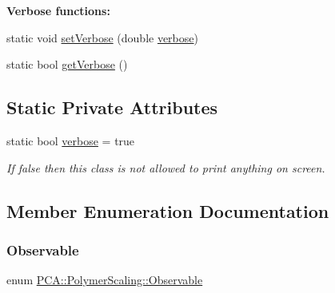 \begin{Indent}{\bf Verbose functions\+:}\par
\begin{DoxyCompactItemize}
\item 
static void \hyperlink{class_p_c_a_1_1_polymer_scaling_a02f133a0bfdf54a7677c8f9637a4238a}{set\+Verbose} (double \hyperlink{class_p_c_a_1_1_polymer_scaling_ade3a687fb33d7c74e78b38d3aca3a1ab}{verbose})
\item 
static bool \hyperlink{class_p_c_a_1_1_polymer_scaling_a9c421969a837baea23237375653898f6}{get\+Verbose} ()
\end{DoxyCompactItemize}
\end{Indent}
\subsection*{Static Private Attributes}
\begin{DoxyCompactItemize}
\item 
static bool \hyperlink{class_p_c_a_1_1_polymer_scaling_ade3a687fb33d7c74e78b38d3aca3a1ab}{verbose} = true
\begin{DoxyCompactList}\small\item\em If false then this class is not allowed to print anything on screen. \end{DoxyCompactList}\end{DoxyCompactItemize}


\subsection{Member Enumeration Documentation}
\hypertarget{class_p_c_a_1_1_polymer_scaling_aa4112660455a10f29c208c96655718c0}{}\label{class_p_c_a_1_1_polymer_scaling_aa4112660455a10f29c208c96655718c0} 
\subsubsection{\texorpdfstring{Observable}{Observable}}
{\footnotesize\ttfamily enum \hyperlink{class_p_c_a_1_1_polymer_scaling_aa4112660455a10f29c208c96655718c0}{P\+C\+A\+::\+Polymer\+Scaling\+::\+Observable}\hspace{0.3cm}{\ttfamily [strong]}}

